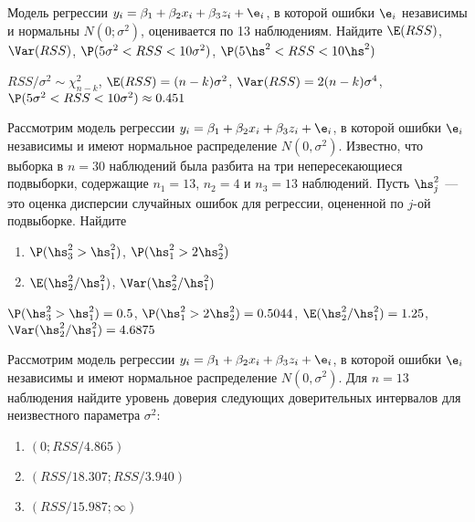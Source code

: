 \documentclass[pdftex,11pt,openany]{book}\usepackage[]{graphicx}\usepackage[]{color}
\begin{document}
\begin{solution}
\end{solution}


\begin{problem}
 Модель регрессии $y_i = \beta_1 + \beta_2 x_i + \beta_3 z_i + \e_i$, в которой ошибки
$\e_i$ независимы и нормальны $N(0;\sigma^2)$, оценивается по 13 наблюдениям. Найдите $\E(RSS)$, $\Var(RSS)$, $\P(5\sigma^2<RSS<10\sigma^2)$, $\P(5\hs^2<RSS<10\hs^2)$
\end{problem}
 
\begin{solution}
 $RSS/\sigma^2\sim\chi^2_{n-k}$, $\E(RSS)=(n-k)\sigma^2$, $\Var(RSS)=2(n-k)\sigma^4$, $\P(5\sigma^2<RSS<10\sigma^2)\approx 0.451$ 
\end{solution}


\begin{problem}
 Рассмотрим модель регрессии $y_i=\beta_1+\beta_2 x_i + \beta_3 z_i+\e_i$, в которой
ошибки $\e_i$ независимы и имеют нормальное распределение $N(0,\sigma^2)$. Известно, что выборка в $n = 30$
наблюдений была разбита на три непересекающиеся подвыборки, содержащие $n_1 = 13$, $n_2 = 4$ и $n_3 = 13$ наблюдений. Пусть $\hs_{j}^2$ --- это оценка дисперсии случайных ошибок для
регрессии, оцененной по $j$-ой подвыборке. Найдите 
\begin{enumerate}
\item  $\P(\hs_3^2>\hs_1^2)$, $\P(\hs_1^2>2\hs_2^2)$
\item $\E(\hs_2^2/\hs_1^2)$, $\Var(\hs_2^2/\hs_1^2)$
\end{enumerate}
\end{problem}
 
\begin{solution}
 $\P(\hs_3^2>\hs_1^2)=0.5$, $\P(\hs_1^2>2\hs_2^2)=0.5044$, $\E(\hs_2^2/\hs_1^2)=1.25$, $\Var(\hs_2^2/\hs_1^2)=4.6875$
 \end{solution}

\begin{problem}
 Рассмотрим модель регрессии $y_i=\beta_1+\beta_2 x_i + \beta_3 z_i+\e_i$, в которой
ошибки $\e_i$ независимы и имеют нормальное распределение $N(0,\sigma^2)$. Для $n = 13$ наблюдения найдите уровень
доверия следующих доверительных интервалов для неизвестного параметра $\sigma^2$:
\begin{enumerate}
\item $(0;RSS/4.865)$ 
\item $(RSS/18.307;RSS/3.940)$
\item $(RSS/15.987;\infty)$
\end{enumerate}
\end{problem}
 
\end{document}
